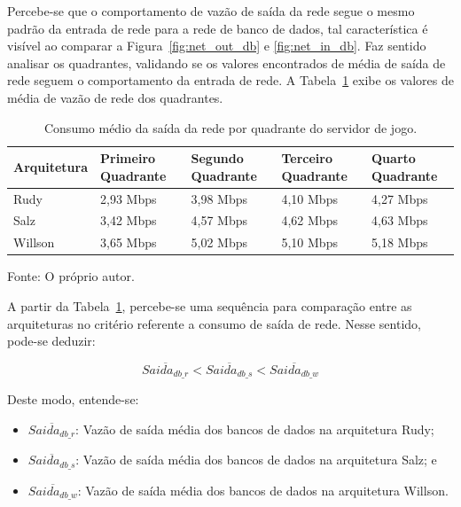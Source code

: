 Percebe-se que o comportamento de vazão de saída da rede segue o mesmo padrão da entrada de rede para a rede de banco de dados, tal característica é visível ao comparar a Figura~\ref{fig:net_out_db} e \ref{fig:net_in_db}.
%
Faz sentido analisar os quadrantes, validando se os valores encontrados de média de saída de rede seguem o comportamento da entrada de rede.
%
A Tabela~\ref{tab:net_out_db_media_quadrantes} exibe os valores de média de vazão de rede dos quadrantes.

\begin{table}[htb!]
\centering
\begin{adjustbox}{max width=\textwidth}
\caption{Consumo médio da saída da rede por quadrante do servidor de jogo.}
\label{tab:net_out_db_media_quadrantes}

\begin{tabular}{l|l|l|l|l}
\hline \hline
Arquitetura & Primeiro Quadrante & Segundo Quadrante & Terceiro Quadrante & Quarto Quadrante \\ \hline \hline
Rudy        & 2,93 Mbps            & 3,98 Mbps           & 4,10 Mbps            & 4,27 Mbps          \\ \hline
Salz        & 3,42 Mbps            & 4,57 Mbps           & 4,62 Mbps            & 4,63 Mbps          \\ \hline
Willson     & 3,65 Mbps            & 5,02 Mbps          & 5,10 Mbps            & 5,18 Mbps          \\ \hline \hline
\end{tabular}
\end{adjustbox}

Fonte: O próprio autor.
\end{table}

A partir da Tabela~\ref{tab:net_out_db_media_quadrantes}, percebe-se uma sequência para comparação entre as arquiteturas no critério referente a consumo de saída de rede.
%
Nesse sentido, pode-se deduzir:

$$
    \overline{Saida_{db\_r}} < \overline{Saida_{db\_s}} < \overline{Saida_{db\_w}}
$$

Deste modo, entende-se:

\begin{itemize}
 \item $\overline{Saida_{db\_r}}$: Vazão de saída média dos bancos de dados na arquitetura Rudy;
 \item $\overline{Saida_{db\_s}}$: Vazão de saída média dos bancos de dados na arquitetura Salz; e
 \item $\overline{Saida_{db\_w}}$: Vazão de saída média dos bancos de dados na arquitetura Willson.
\end{itemize}

